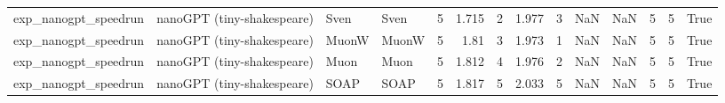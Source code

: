 \begin{tabular}{llllrrrrrrrrrr}
exp\_nanogpt\_speedrun & nanoGPT (tiny-shakespeare) & Sven & Sven & 5 & 1.715 & 2 & 1.977 & 3 & NaN & NaN & 5 & 5 & True \\
exp\_nanogpt\_speedrun & nanoGPT (tiny-shakespeare) & MuonW & MuonW & 5 & 1.81 & 3 & 1.973 & 1 & NaN & NaN & 5 & 5 & True \\
exp\_nanogpt\_speedrun & nanoGPT (tiny-shakespeare) & Muon & Muon & 5 & 1.812 & 4 & 1.976 & 2 & NaN & NaN & 5 & 5 & True \\
exp\_nanogpt\_speedrun & nanoGPT (tiny-shakespeare) & SOAP & SOAP & 5 & 1.817 & 5 & 2.033 & 5 & NaN & NaN & 5 & 5 & True \\
\bottomrule
\end{tabular}
